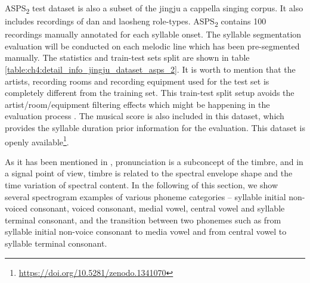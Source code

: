 ASPS\textsubscript{2} test dataset is also a subset of the jingju a cappella singing corpus. It also includes recordings of \gls{dan} and \gls{laosheng} role-types. ASPS\textsubscript{2} contains 100 recordings manually annotated for each syllable onset. The syllable segmentation evaluation will be conducted on each melodic line which has been pre-segmented manually. The statistics and train-test sets split are shown in table \ref{table:ch4:detail_info_jingju_dataset_asps_2}. It is worth to mention that the artists, recording rooms and recording equipment used for the test set is completely different from the training set. This train-test split setup avoids the artist/room/equipment filtering effects which might be happening in the evaluation process \cite{Flexer2010}. The musical score is also included in this dataset, which provides the syllable duration prior information for the evaluation. This dataset is openly available\footnote{\url{https://doi.org/10.5281/zenodo.1341070}\label{fn:jingju_dataset}}.

As it has been mentioned in , pronunciation is a subconcept of the timbre, and in a signal point of view, timbre is related to the spectral envelope shape and the time variation of spectral content. In the following of this section, we show several spectrogram examples of various phoneme categories -- syllable initial non-voiced consonant, voiced consonant, medial vowel, central vowel and syllable terminal consonant, and the transition between two phonemes such as from syllable initial non-voice consonant to media vowel and from central vowel to syllable terminal consonant.

